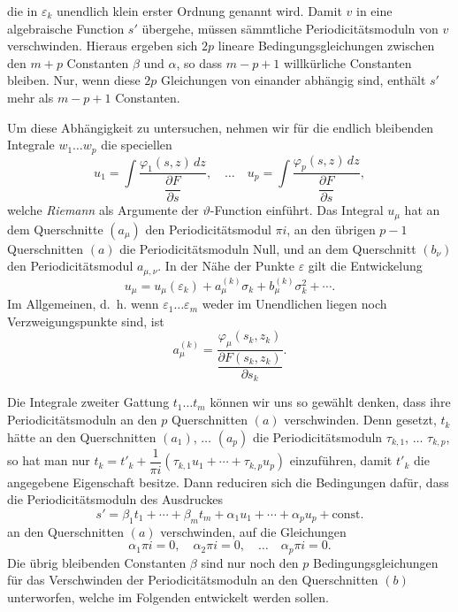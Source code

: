 \documentclass{article}
\begin{document}
die in $\varepsilon_{k}$ unendlich klein erster Ordnung genannt wird. Damit $v$ in eine algebraische Function $s'$ übergehe, müssen sämmtliche Periodicitätsmoduln von $v$ verschwinden. Hieraus ergeben sich $2p$ lineare Bedingungsgleichungen zwischen den $m+p$ Constanten $\beta$ und $\alpha$, so dass $m-p+1$ willkürliche Constanten bleiben. Nur, wenn diese $2p$ Gleichungen von einander abhängig sind, enthält $s'$ mehr als $m-p+1$ Constanten.

Um diese Abhängigkeit zu untersuchen, nehmen wir für die endlich bleibenden Integrale $w_{1} \ldots w_{p}$ die speciellen
\[ u_{1} = \int \frac{\varphi_{1}(s, z)\,dz}{\dfrac{\partial F}{\partial s}}, \quad \ldots \quad u_{p} = \int \frac{\varphi_{p}(s, z)\,dz}{\dfrac{\partial F}{\partial s}}, \]
welche \emph{Riemann} als Argumente der $\vartheta$-Function einführt. Das Integral $u_{\mu}$ hat an dem Querschnitte $(a_{\mu})$ den Periodicitätsmodul $\pi i$, an den übrigen $p-1$ Querschnitten $(a)$ die Periodicitätsmoduln Null, und an dem Querschnitt $(b_{\nu})$ den Periodicitätsmodul $a_{\mu, \nu}$. In der Nähe der Punkte $\varepsilon$ gilt die Entwickelung
\[ u_{\mu} = u_{\mu}(\varepsilon_{k}) + a_{\mu}^{(k)} \sigma_{k} + b_{\mu}^{(k)} \sigma_{k}^{2} + \cdots. \tag{a.} \]
Im Allgemeinen, d.~h. wenn $\varepsilon_{1} \ldots \varepsilon_{m}$ weder im Unendlichen liegen noch Verzweigungspunkte sind, ist
\[ a_{\mu}^{(k)} = \frac{\varphi_{\mu}(s_{k}, z_{k})}{\dfrac{\partial F(s_{k}, z_{k})}{\partial s_{k}}}. \]

Die Integrale zweiter Gattung $t_{1} \ldots t_{m}$ können wir uns so gewählt denken, dass ihre Periodicitätsmoduln an den $p$ Querschnitten $(a)$ verschwinden. Denn gesetzt, $t_{k}$ hätte an den Querschnitten $(a_{1})$, $\ldots$ $(a_{p})$ die Periodicitätsmoduln $\tau_{k,1}$, $\ldots$ $\tau_{k,p}$, so hat man nur $t_{k} = t'_{k} + \dfrac{1}{\pi i}(\tau_{k,1} u_{1} + \cdots + \tau_{k,p} u_{p})$ einzuführen, damit $t'_{k}$ die angegebene Eigenschaft besitze. Dann reduciren sich die Bedingungen dafür, dass die Periodicitätsmoduln des Ausdruckes
\[ s' = \beta_{1} t_{1} + \cdots + \beta_{m} t_{m} + \alpha_{1} u_{1} + \cdots + \alpha_{p} u_{p} + \text{const.} \]
an den Querschnitten $(a)$ verschwinden, auf die Gleichungen
\[ \alpha_{1} \pi i = 0, \quad \alpha_{2} \pi i = 0, \quad \ldots \quad \alpha_{p} \pi i = 0. \]
Die übrig bleibenden Constanten $\beta$ sind nur noch den $p$ Bedingungsgleichungen für das Verschwinden der Periodicitätsmoduln an den Querschnitten $(b)$ unterworfen, welche im Folgenden entwickelt werden sollen.
\end{document}
